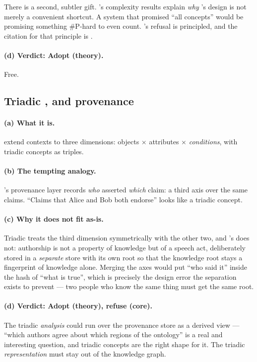 There is a second, subtler gift. \fca{}'s complexity results explain
\emph{why} \odag{}'s design is not merely a convenient shortcut. A system that
promised ``all concepts'' would be promising something $\#\mathrm{P}$-hard to
even count. \odag{}'s refusal is principled, and the citation for that
principle is \citet{kuznetsov2001}.

\paragraph{(d) Verdict: \textbf{Adopt (theory)}.} Free.

\subsection{Triadic \fca{}, and provenance}

\paragraph{(a) What it is.} \citet{lehmann1995} extend contexts to three
dimensions: objects $\times$ attributes $\times$ \emph{conditions}, with
triadic concepts as triples.

\paragraph{(b) The tempting analogy.} \odag{}'s provenance layer records
\emph{who} asserted \emph{which} claim: a third axis over the same claims.
``Claims that Alice and Bob both endorse'' looks like a triadic concept.

\paragraph{(c) Why it does not fit as-is.} Triadic \fca{} treats the third
dimension symmetrically with the other two, and \odag{}'s does not:
authorship is not a property of knowledge but of a speech act, deliberately
stored in a \emph{separate} store with its own root so that the knowledge root
stays a fingerprint of knowledge alone. Merging the axes would put ``who said
it'' inside the hash of ``what is true'', which is precisely the design error
the separation exists to prevent --- two people who know the same thing must
get the same root.

\paragraph{(d) Verdict: \textbf{Adopt (theory), refuse (core)}.} The triadic
\emph{analysis} could run over the provenance store as a derived view --- ``which
authors agree about which regions of the ontology'' is a real and interesting
question, and triadic concepts are the right shape for it. The triadic
\emph{representation} must stay out of the knowledge graph.

